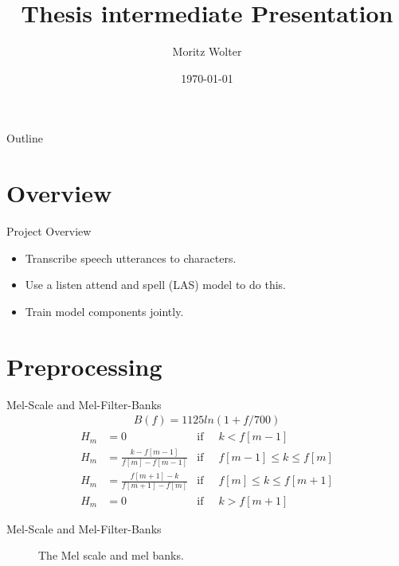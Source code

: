 \documentclass{beamer}
\title{Thesis intermediate Presentation}
\author{Moritz Wolter}
\date{\today}
\begin{document}
\begin{frame}
  \titlepage
\end{frame}


\begin{frame}{Outline}
  \tableofcontents
\end{frame}

\section{Overview}
\begin{frame}{Project Overview}
	\begin{itemize}
		\item Transcribe speech utterances to characters. 
		\item Use a listen attend and spell (LAS) model to do this.
		\item Train model components jointly.
	\end{itemize}
\end{frame}



\section{Preprocessing}
\begin{frame}{Mel-Scale and Mel-Filter-Banks}
\begin{align}
	B(f) = 1125 ln(1 + f / 700)
\end{align}
\begin{align}
	H_m &= 0 				                       & \text{if}\;\; & k < f[m-1] \\
	H_m &= \frac{k      - f[m-1] }{f[m] - f[m-1]}  &\text{if}\;\; & f[m-1] \leq k \leq f[m] \\
	H_m &= \frac{f[m+1] - k      }{f[m + 1] - f[m]}&\text{if}\;\; & f[m] \leq k \leq f[m+1] \\
	H_m &= 0									   &\text{if}\;\; & k > f[m+1] 
\end{align}
\end{frame}

\begin{frame}{Mel-Scale and Mel-Filter-Banks}
\begin{figure}
	
	
	\caption{The Mel scale and mel banks.}
	\label{fig:melBank}
\end{figure}
\end{frame}
\end{document}
